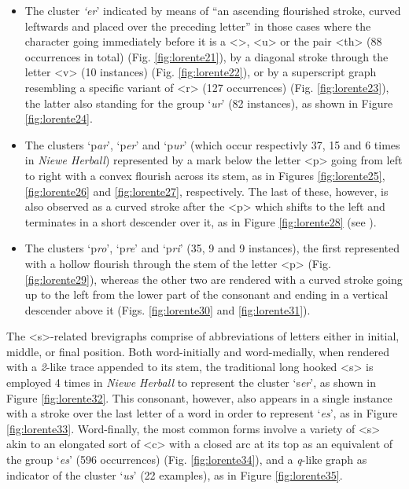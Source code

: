\documentclass{article}
\begin{document}
\begin{itemize}
\item
  The cluster \emph{`er}' indicated by means of ``an ascending
  flourished stroke, curved leftwards and placed over the preceding
  letter'' \citep[119]{calle-martin_corpus-based_2021} in those cases where the character
  going immediately before it is a \textless \th\textgreater,
  \textless u\textgreater{} or the pair \textless th\textgreater{} (88
  occurrences in total) (Fig. \ref{fig:lorente21}), by a diagonal stroke through the
  letter \textless v\textgreater{} (10 instances) \citep[131]{tannenbaum_handwriting_1930}
  (Fig. \ref{fig:lorente22}), or by a superscript graph resembling a specific variant
  of \textless r\textgreater{} (127 occurrences) (Fig. \ref{fig:lorente23}), the latter
  also standing for the group `\emph{ur}' (82 instances), as shown in
  Figure \ref{fig:lorente24}.
\item
  The clusters `p\emph{ar}', `p\emph{er}' and `p\emph{ur}' (which occur respectivly 37, 15 and 6 times in \emph{Niewe Herball}) represented by a mark below
  the letter \textless p\textgreater{} going from left to right with a
  convex flourish across its stem, as in Figures \ref{fig:lorente25}, \ref{fig:lorente26} and \ref{fig:lorente27},
  respectively. The last of these, however, is also observed as a curved stroke after the \textless p\textgreater{} which
  shifts to the left and terminates in a short descender over it, as in
  Figure \ref{fig:lorente28} (see \cite[128--129]{tannenbaum_handwriting_1930}).
\item
  The clusters `p\emph{ro}', `p\emph{re}' and `p\emph{ri}' (35, 9 and 9
  instances), the first represented with a hollow flourish through the
  stem of the letter \textless p\textgreater{} (Fig. \ref{fig:lorente29}), whereas the
  other two are rendered with a curved stroke going up to the left from
  the lower part of the consonant and ending in a vertical descender
  above it (Figs. \ref{fig:lorente30} and \ref{fig:lorente31}).
\end{itemize}

The \textless s\textgreater-related brevigraphs
comprise of abbreviations of letters either in initial, middle, or
final position. Both word-initially and word-medially, when rendered
with a \emph{2}-like trace appended to its stem, the traditional long
hooked \textless s\textgreater{} is employed 4 times in \emph{Niewe
Herball} to represent the cluster `s\emph{er}', as shown in Figure \ref{fig:lorente32}.
This consonant, however, also appears in a single instance with a stroke
over the last letter of a word in order to represent `\emph{es}', as in
Figure \ref{fig:lorente33}. Word-finally, the most common forms involve a variety of
\textless s\textgreater{} akin to an elongated sort of
\textless c\textgreater{} with a closed arc at its top as an equivalent
of the group `\emph{es}' (596 occurrences) (Fig. \ref{fig:lorente34}), and a
\emph{q}-like graph as indicator of the cluster `\emph{us}' (22
examples), as in Figure \ref{fig:lorente35}.
\end{document}
